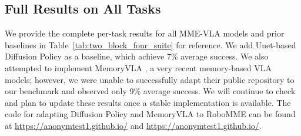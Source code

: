 \clearpage
\subsection{Full Results on All Tasks}
\label{sec:results_all_tasks}

We provide the complete per-task results for all MME-VLA models and prior baselines in Table~\ref{tab:two_block_four_suite} for reference. We add Unet-based Diffusion Policy \cite{chi2025diffusion} as a baseline, which achieve 7\% average success. 
We also attempted to implement MemoryVLA \cite{shi2025memoryvla}, a very recent memory-based VLA models; however, we were unable to successfully adapt their public repository to our benchmark and observed only 9\% average success. 
We will continue to check and plan to update these results once a stable implementation is available.
The code for adapting Diffusion Policy and MemoryVLA to RoboMME can be found at \url{https://anonymtest1.github.io/} and
\url{https://anonymtest1.github.io/}.


